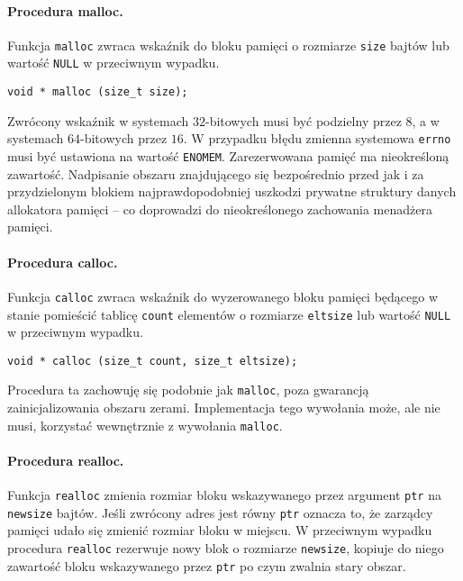 \documentclass[12pt,a4paper,titlepage,twoside]{mwart}
\begin{document}
\paragraph{Procedura malloc.}

Funkcja \texttt{malloc} zwraca wskaźnik do bloku pamięci o rozmiarze
\texttt{size} bajtów lub wartość \texttt{NULL} w przeciwnym wypadku.

\vspace{2ex}
\begin{lstlisting}[caption={Prototyp procedury \texttt{malloc}.}]
void * malloc (size_t size);
\end{lstlisting}

Zwrócony wskaźnik w systemach $32$-bitowych musi być podzielny przez $8$, a w
systemach $64$-bitowych przez $16$. W przypadku błędu zmienna systemowa
\texttt{errno} musi być ustawiona na wartość \texttt{ENOMEM}. Zarezerwowana
pamięć ma nieokreśloną zawartość. Nadpisanie obszaru znajdującego się
bezpośrednio przed jak i za przydzielonym blokiem najprawdopodobniej uszkodzi
prywatne struktury danych allokatora pamięci -- co doprowadzi do nieokreślonego
zachowania menadżera pamięci.

\paragraph{Procedura calloc.}

Funkcja \texttt{calloc} zwraca wskaźnik do wyzerowanego bloku pamięci będącego
w stanie pomieścić tablicę \texttt{count} elementów o rozmiarze
\texttt{eltsize} lub wartość \texttt{NULL} w przeciwnym wypadku.

\vspace{2ex}
\begin{lstlisting}[caption={Prototyp procedury \texttt{calloc}.}]
void * calloc (size_t count, size_t eltsize);
\end{lstlisting}

Procedura ta zachowuję się podobnie jak \texttt{malloc}, poza gwarancją
zainicjalizowania obszaru zerami. Implementacja tego wywołania może, ale nie
musi, korzystać wewnętrznie z wywołania \texttt{malloc}.

\paragraph{Procedura realloc.}

Funkcja \texttt{realloc} zmienia rozmiar bloku wskazywanego przez argument
\texttt{ptr} na \texttt{newsize} bajtów. Jeśli zwrócony adres jest równy
\texttt{ptr} oznacza to, że zarządcy pamięci udało się zmienić rozmiar bloku w
miejscu. W przeciwnym wypadku procedura \texttt{realloc} rezerwuje nowy blok o
rozmiarze \texttt{newsize}, kopiuje do niego zawartość bloku wskazywanego przez
\texttt{ptr} po czym zwalnia stary obszar.
\end{document}
